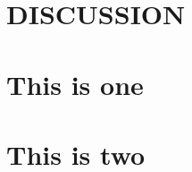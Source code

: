 \documentclass[12pt]{book}
\numberwithin{equation}{chapter}
\begin{document}
\hypertarget{discussion}{%
\chapter{DISCUSSION}\label{discussion}}

\cleardoublepage




\cleardoublepage

\hypertarget{appendix-appendix}{%
\appendix}


\hypertarget{this-is-one}{%
\chapter{This is one}\label{this-is-one}}

\hypertarget{this-is-two}{%
\chapter{This is two}\label{this-is-two}}







\backmatter
\printindex
\end{document}
